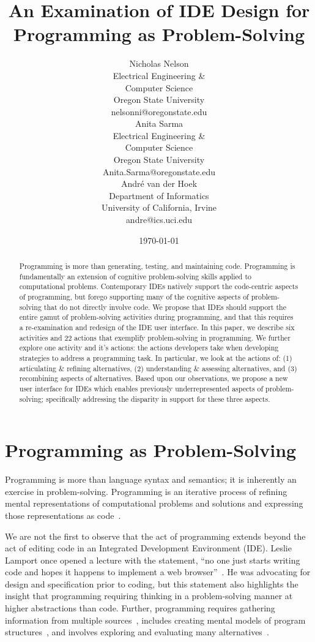 \documentclass{ppig}
\title{An Examination of IDE Design for Programming as Problem-Solving}
\author{Nicholas Nelson \\
  Electrical Engineering \&\\ Computer Science \\
  Oregon State University \\
  nelsonni@oregonstate.edu \\
  \And
  Anita Sarma \\
  Electrical Engineering \&\\ Computer Science \\
  Oregon State University \\
  Anita.Sarma@oregonstate.edu \\
  \And
  André van der Hoek \\
  Department of Informatics \\
  University of California, Irvine \\
  andre@ics.uci.edu
}
\date{\today}
\begin{document}
\maketitle
\thispagestyle{empty}

\begin{abstract}

Programming is more than generating, testing, and maintaining code.
Programming is fundamentally an extension of cognitive problem-solving skills applied to computational problems.
Contemporary IDEs natively support the code-centric aspects of programming, but forego supporting many of the cognitive aspects of problem-solving that do not directly involve code.
We propose that IDEs should support the entire gamut of problem-solving activities during programming, and that this requires a re-examination and redesign of the IDE user interface.
In this paper, we describe six activities and 22 actions that exemplify problem-solving in programming.
We further explore one activity and it's actions: the actions developers take when developing strategies to address a programming task.
In particular, we look at the actions of: (1) articulating \& refining alternatives, (2) understanding \& assessing alternatives, and (3) recombining aspects of alternatives.
Based upon our observations, we propose a new user interface for IDEs which enables previously underrepresented aspects of problem-solving; specifically addressing the disparity in support for these three aspects. 
\end{abstract}

\section{Programming as Problem-Solving}

Programming is more than language syntax and semantics; it is inherently an exercise in problem-solving.
Programming is an iterative process of refining mental representations of computational problems and solutions and expressing those representations as code~\cite{loksa2016programming}.

We are not the first to observe that the act of programming extends beyond the act of editing code in an Integrated Development Environment (IDE).
Leslie Lamport once opened a lecture with the statement, ``no one just starts writing code and hopes it happens to implement a web browser''~\cite{lamport2015lecture}.
He was advocating for design and specification prior to coding, but this statement also highlights the insight that programming requiring thinking in a problem-solving manner at higher abstractions than code.
Further, programming requires gathering information from multiple sources~\cite{sillito2008asking}, includes creating mental models of program structures~\cite{von1995comprehension}, and involves exploring and evaluating many alternatives~\cite{hartmann2008design}.
\end{document}
